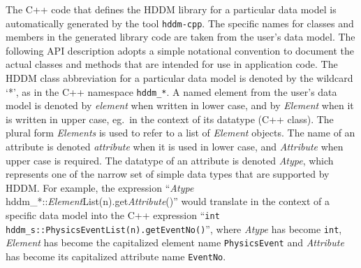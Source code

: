 \documentclass{revtex4}
\begin{document}
The C++ code that defines the HDDM library for a particular data model is
automatically generated by the tool \texttt{hddm-cpp}. The specific names
for classes and members in the generated library code are taken from the
user's data model. The following API description adopts a simple notational
convention to document the actual classes and methods that are intended for
use in application code. The HDDM class abbreviation for a particular data
model is denoted by the wildcard `*', as in the C++ namespace
\texttt{hddm\_*}.
A named element from the user's data model is denoted by {\em element}
when written in lower case, and by {\em Element} when it is written in
upper case, eg.\ in the context of its datatype (C++ class). The plural
form {\em Elements} is used to refer to a list of {\em Element} objects.
The name of an attribute is denoted {\em attribute} when it is
used in lower case, and {\em Attribute} when upper case is required.
The datatype of an attribute is denoted {\em Atype}, which
represents one of the narrow set of simple data types that are supported
by HDDM. For example, the expression 
``{\em Atype} hddm\_*::{\em Element}List(n).get{\em Attribute}()'' would
translate in the context of a specific data model into the C++ expression
``\texttt{int hddm\_s::PhysicsEventList(n).getEventNo()}'', where {\em Atype}
has become \texttt{int}, {\em Element} has become the capitalized 
element name \texttt{PhysicsEvent} and {\em Attribute} has become
its capitalized attribute name \texttt{EventNo}.
\end{document}
